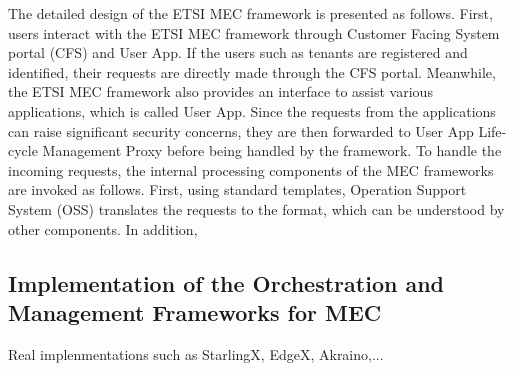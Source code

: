 The detailed design of the ETSI MEC framework is presented as follows. 
First, users interact with the ETSI MEC framework through Customer Facing System portal (CFS) and User App. If the users such as tenants are registered and identified, their requests are directly made through the CFS portal. Meanwhile, the ETSI MEC framework also provides an interface to assist various applications, which is called User App. Since the requests from the applications can raise significant security concerns, they are then forwarded to User App Life-cycle Management Proxy before being handled by the framework. To handle the incoming requests, the internal processing components of the MEC frameworks are invoked as follows. First, using standard templates, Operation Support System (OSS) translates the requests to the format, which can be understood by other components. In addition,   


\subsection{Implementation of the Orchestration and Management Frameworks for MEC}

Real implenmentations such as StarlingX, EdgeX, Akraino,... 

